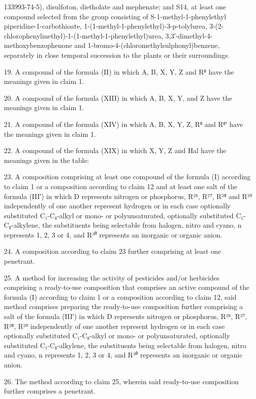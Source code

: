 \documentclass[11pt,a4paper]{article}
\begin{document}
133993-74-5), disulfoton, dietholate and mephenate; and S14, at least one compound selected from the group consisting of S-1-methyl-1-phenylethyl piperidine-1-carbothioate, 1-(1-methyl-1-phenylethyl)-3-p-tolylurea, 3-(2-chlorophenylmethyl)-1-(1-methyl-1-phenylethyl)urea, 3,3′-dimethyl-4-methoxybenzophenone and 1-bromo-4-(chloromethylsulphonyl)benzene, separately in close temporal succession to the plants or their surroundings.

19. A compound of the formula (II) in which A, B, X, Y, Z and R⁸ have the meanings given in claim 1.

20. A compound of the formula (XIII) in which A, B, X, Y, and Z have the meanings given in claim 1.

21. A compound of the formula (XIV) in which A, B, X, Y, Z, R⁸ and R⁸′ have the meanings given in claim 1.

22. A compound of the formula (XIX) in which X, Y, Z and Hal have the meanings given in the table:

23. A composition comprising at least one compound of the formula (I) according to claim 1 or a composition according to claim 12 and at least one salt of the formula (III′) in which D represents nitrogen or phosphorus, R²⁶, R²⁷, R²⁸ and R²⁹ independently of one another represent hydrogen or in each case optionally substituted C₁-C₈-alkyl or mono- or polyunsaturated, optionally substituted C₁-C₈-alkylene, the substituents being selectable from halogen, nitro and cyano, n represents 1, 2, 3 or 4, and R³⁰ represents an inorganic or organic anion.

24. A composition according to claim 23 further comprising at least one penetrant.

25. A method for increasing the activity of pesticides and/or herbicides comprising a ready-to-use composition that comprises an active compound of the formula (I) according to claim 1 or a composition according to claim 12, said method comprises preparing the ready-to-use composition further comprising a salt of the formula (III′) in which D represents nitrogen or phosphorus, R²⁶, R²⁷, R²⁸, R²⁹ independently of one another represent hydrogen or in each case optionally substituted C₁-C₈-alkyl or mono- or polyunsaturated, optionally substituted C₁-C₈-alkylene, the substituents being selectable from halogen, nitro and cyano, n represents 1, 2, 3 or 4, and R³⁰ represents an inorganic or organic anion.

26. The method according to claim 25, wherein said ready-to-use composition further comprises a penetrant.
\end{document}
